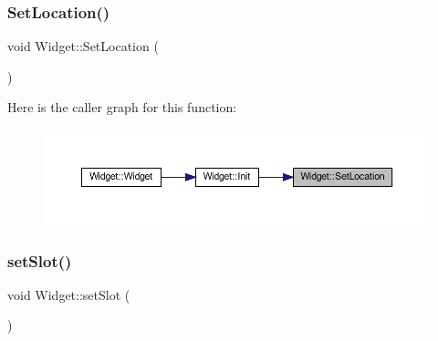 \subsubsection{\texorpdfstring{SetLocation()}{SetLocation()}}
{\footnotesize\ttfamily void Widget\+::\+Set\+Location (\begin{DoxyParamCaption}{ }\end{DoxyParamCaption})}

Here is the caller graph for this function\+:
\nopagebreak
\begin{figure}[H]
\begin{center}
\leavevmode
\includegraphics[width=350pt]{class_widget_a2f0684dd82782945ee9dc918d9ac30a5_icgraph}
\end{center}
\end{figure}
\mbox{\label{class_widget_ac60c5a62bc3197fbc7ade8f40df70c70}} 
\subsubsection{\texorpdfstring{setSlot()}{setSlot()}}
{\footnotesize\ttfamily void Widget\+::set\+Slot (\begin{DoxyParamCaption}{ }\end{DoxyParamCaption})}

